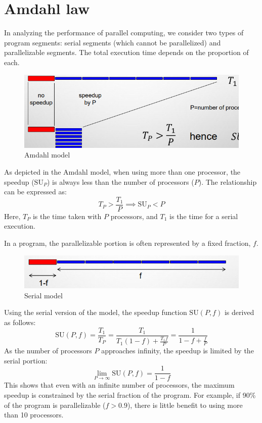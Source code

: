 \section{Amdahl law}

In analyzing the performance of parallel computing, we consider two types of program segments: serial segments (which cannot be parallelized) and parallelizable segments. 
The total execution time depends on the proportion of each.
\begin{figure}[H]
    \centering
    \includegraphics[width=0.75\linewidth]{images/am.png}
    \caption{Amdahl model}
\end{figure}
As depicted in the Amdahl model, when using more than one processor, the speedup ($\text{SU}_P$) is always less than the number of processors ($P$). 
The relationship can be expressed as:
\[T_P>\dfrac{T_1}{P}\implies \text{SU}_P<P\]
Here, $T_P$ is the time taken with $P$ processors, and $T_1$ is the time for a serial execution.

In a program, the parallelizable portion is often represented by a fixed fraction, $f$. 
\begin{figure}[H]
    \centering
    \includegraphics[width=0.75\linewidth]{images/am1.png}
    \caption{Serial model}
\end{figure}
Using the serial version of the model, the speedup function $\text{SU}(P, f)$ is derived as follows:
\[\text{SU}(P,f)=\dfrac{T_1}{T_P}=\dfrac{T_1}{T_1(1-f)+\frac{T_1f}{P}}=\dfrac{1}{1-f+\frac{f}{P}}\]
As the number of processors $P$ approaches infinity, the speedup is limited by the serial portion:
\[\lim_{P\rightarrow\infty}\text{SU}(P,f)=\dfrac{1}{1-f}\]
This shows that even with an infinite number of processors, the maximum speedup is constrained by the serial fraction of the program. 
For example, if 90\% of the program is parallelizable ($f > 0.9$), there is little benefit to using more than 10 processors.

